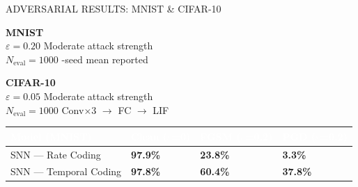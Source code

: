 \documentclass[final]{beamer}
\newlength{\coltwo}
\begin{document}
\begin{frame}[t]
\begin{columns}[t]
\begin{column}{\coltwo}
  \begin{block}{ADVERSARIAL RESULTS: MNIST \& CIFAR-10}
    \begin{tcolorbox}[
      enhanced, colback=lightiitblue, colframe=iitgnblue,
      arc=6pt, boxrule=1.5pt,
      left=10pt, right=10pt, top=7pt, bottom=7pt,
      width=\columnwidth
    ]
      \small
      \begin{minipage}[t]{0.48\linewidth}
        \textcolor{iitgnblue}{\bfseries MNIST} \\[0.3em]
        \textcolor{iitgnblue!80!black}{
          $\varepsilon = 0.20$ \textbullet\; Moderate attack strength \\
          $N_{\text{eval}} = 1000$ \textbullet{}-seed mean reported
        }
      \end{minipage}%
      \hfill\vline\hfill
      \begin{minipage}[t]{0.48\linewidth}
        \textcolor{iitgnblue}{\bfseries CIFAR-10} \\[0.3em]
        \textcolor{iitgnblue!80!black}{
          $\varepsilon = 0.05$ \textbullet\; Moderate attack strength \\
          $N_{\text{eval}} = 1000$ \textbullet\; Conv$\times$3 $\to$ FC $\to$ LIF
        }
      \end{minipage}
    \end{tcolorbox}

    \vspace{0.8em}

\renewcommand{\arraystretch}{1.4}
\setlength{\tabcolsep}{4pt}

\begin{tabularx}{\columnwidth}{|
>{\centering\arraybackslash}p{}|
>{\centering\arraybackslash}X|
>{\centering\arraybackslash}X|
>{\centering\arraybackslash}X|
}
\hline
\rowcolor{iitgnblue}
\textbf{\textcolor{white}{\small Model (MNIST)}} &
\textbf{\textcolor{white}{\small Clean ($\varepsilon$=0)}} &
\textbf{\textcolor{white}{\small FGSM ($\varepsilon$=0.2)}} &
\textbf{\textcolor{white}{\small PGD ($\varepsilon$=0.2)}} \\
\hline

\rowcolor{blue!8}
\small SNN --- Rate Coding &
\textbf{\small 97.9\%} & \textbf{\small 23.8\%} & \textbf{\small 3.3\%} \\
\hline

\rowcolor{orange!10}
\small SNN --- Temporal Coding &
\textbf{\small 97.8\%} & \textbf{\small 60.4\%} & \textbf{\small 37.8\%} \\
\hline


\end{tabularx}
\end{block}
\end{column}
\end{columns}
\end{frame}
\end{document}
